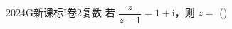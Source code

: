
\begin{problem}{2024}{G}{新课标I卷}{2}{复数}
若 $\dfrac{z}{z-1}=1+\mathrm{i}$，则 $z=$
(\hspace{1cm})
\begin{choices}
\end{choices}
\end{problem}